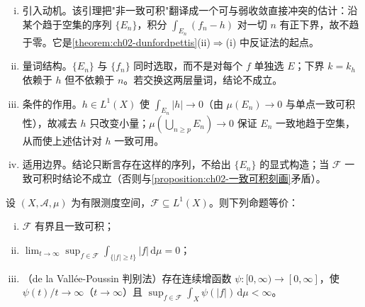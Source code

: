 \documentclass[../../main.tex]{subfiles}%
\begin{document}
\begin{remark}\label{remark:ch02-非一致可积}
\begin{enumerate}[(i)]
\item 引入动机。该引理把"非一致可积"翻译成一个可与弱收敛直接冲突的估计：沿某个趋于空集的序列 $\{E_n\}$，积分 $\int_{E_n}(f_n-h)$ 对一切 $n$ 有正下界，故不趋于零。它是\cref{theorem:ch02-dunfordpettis}(ii)$\Rightarrow$(i) 中反证法的起点。
\item 量词结构。$\{E_n\}$ 与 $\{f_n\}$ 同时选取，而不是对每个 $f$ 单独选 $E$；下界 $k=k_h$ 依赖于 $h$ 但不依赖于 $n$。若交换这两层量词，结论不成立。
\item 条件的作用。$h\in L^1(X)$ 使 $\int_{E_n}|h|\to0$（由 $\mu(E_n)\to0$ 与单点一致可积性），故减去 $h$ 只改变小量；$\mu(\bigcup_{n\geqslant p}E_n)\to0$ 保证 $E_n$ 一致地趋于空集，从而使上述估计对 $h$ 一致可用。
\item 适用边界。结论只断言存在这样的序列，不给出 $\{E_n\}$ 的显式构造；当 $\mathscr F$ 一致可积时结论不成立（否则与\cref{proposition:ch02-一致可积刻画}矛盾）。
\end{enumerate}
\end{remark}

\begin{proposition}\label{proposition:ch02-有界一致可积等价}
设 $(X,\mathscr A,\mu)$ 为有限测度空间，$\mathscr F\subseteq L^1(X)$。则下列命题等价：
\begin{enumerate}[(i)]
\item $\mathscr F$ 有界且一致可积；
\item $\lim_{t\to\infty}\sup_{f\in\mathscr F}\int_{\{|f|\geqslant t\}}|f|\,\mathrm{d}\mu=0$；
\item （de la Vall\'ee-Poussin 判别法）存在连续增函数 $\psi:[0,\infty)\to[0,\infty]$，使 $\psi(t)/t\to\infty$（$t\to\infty$）且 $\sup_{f\in\mathscr F}\int_X\psi(|f|)\,\mathrm{d}\mu<\infty$。
\end{enumerate}
\end{proposition}
\end{document}
